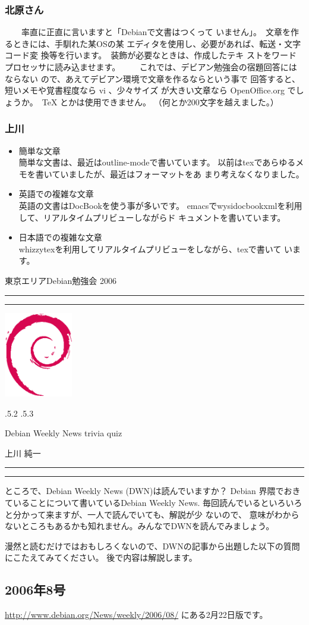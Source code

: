 \documentclass[mingoth,a4paper]{jsarticle}
\makeatletter
\renewcommand{\section}{\@startsection{section}{1}{\z@}%
    {\Cvs \@plus.5\Cdp \@minus.2\Cdp}%
    {.5\Cvs \@plus.3\Cdp}%
    {\normalfont\Large\headfont\raggedright\centering}} %
\newcommand{\dancersection}[2]{%
\newpage
東京エリアDebian勉強会 2006
\hrule
\vspace{0.5mm}
\hrule
\hfill{}\includegraphics[width=3cm]{image200502/openlogo-nd.eps}\\
\vspace{-4cm}
\begin{center}
  \section{#1}
\end{center}
\hfill{}#2\hspace{3cm}\space\\
\hrule
\hrule
\vspace{1cm}
}
\makeatother
\begin{document}
\subsubsection{北原さん}
　　率直に正直に言いますと「Debianで文書はつくって
いません」。　文章を作るときには、手馴れた某OSの某
エディタを使用し、必要があれば、転送・文字コード変
換等を行います。　装飾が必要なときは、作成したテキ
ストをワードプロセッサに読み込ませます。
　　これでは、デビアン勉強会の宿題回答にはならない
ので、あえてデビアン環境で文章を作るならという事で
回答すると、短いメモや覚書程度なら vi 、少々サイズ
が大きい文章なら OpenOffice.org でしょうか。　\TeX
とかは使用できません。
（何とか200文字を越えました。）



\subsubsection{上川}

\begin{itemize}
 \item 簡単な文章 \\
       簡単な文書は、最近はoutline-modeで書いています。
       以前はtexであらゆるメモを書いていましたが、最近はフォーマットをあ
       まり考えなくなりました。
 \item 英語での複雑な文章 \\
       英語の文書はDocBookを使う事が多いです。
       emacsでwysidocbookxmlを利用して、リアルタイムプリビューしながらド
       キュメントを書いています。
 \item 日本語での複雑な文章 \\
       whizzytexを利用してリアルタイムプリビューをしながら、texで書いて
       います。
\end{itemize}

\dancersection{Debian Weekly News trivia quiz}{上川 純一}

ところで、Debian Weekly News (DWN)は読んでいますか？
Debian 界隈でおきていることについて書いているDebian Weekly News.
毎回読んでいるといろいろと分かって来ますが、一人で読んでいても、解説が少
ないので、
意味がわからないところもあるかも知れません。みんなでDWNを読んでみましょう。

漫然と読むだけではおもしろくないので、DWNの記事から出題した以下の質問にこたえてみてください。
後で内容は解説します。

\subsection{2006年8号}
\url{http://www.debian.org/News/weekly/2006/08/}
にある2月22日版です。
\end{document}
